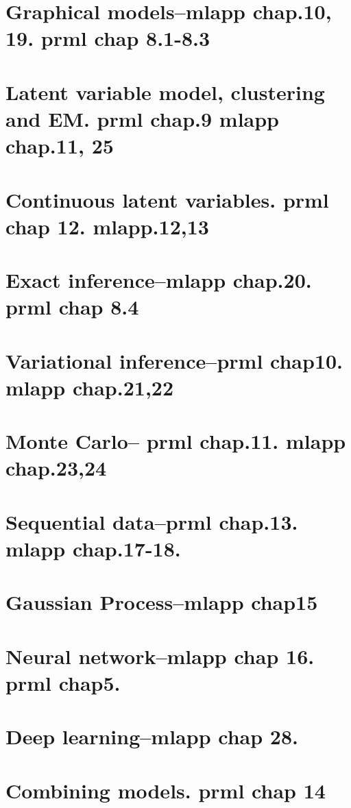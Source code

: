 \documentclass{article}
\begin{document}
\section{Graphical models--mlapp chap.10, 19. prml chap 8.1-8.3}

\section{Latent variable model, clustering and EM. prml chap.9 mlapp chap.11, 25}

\section{Continuous latent variables. prml chap 12. mlapp.12,13}

\section{Exact inference--mlapp chap.20. prml chap 8.4}

\section{Variational inference--prml chap10. mlapp chap.21,22}

\section{Monte Carlo-- prml chap.11. mlapp chap.23,24}

\section{Sequential data--prml chap.13. mlapp chap.17-18.}

\section{Gaussian Process--mlapp chap15}

\section{Neural network--mlapp chap 16. prml chap5.}

\section{Deep learning--mlapp chap 28.}

\section{Combining models. prml chap 14}
\end{document}
